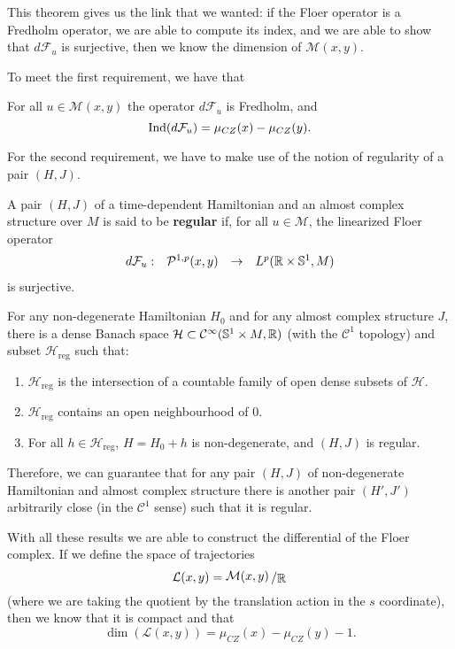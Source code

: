 This theorem gives us the link that we wanted: if the Floer operator is a Fredholm operator, we are able to compute its index, and we are able to show that $d\mathcal{F}_u$ is surjective, then we know the dimension of $\mathcal{M}(x,y)$.

To meet the first requirement, we have that

\begin{theo} \label{theo:floer_fredholm}
For all $u \in \mathcal{M}(x,y)$ the operator $d\mathcal{F}_u$ is Fredholm, and
\[\mathrm{Ind}(d\mathcal{F}_u) = \mu_{CZ}(x) - \mu_{CZ}(y) .\]
\end{theo}

For the second requirement, we have to make use of the notion of regularity of a pair $(H,J)$.

\begin{deff}
A pair $(H,J)$ of a time-dependent Hamiltonian and an almost complex structure over $M$ is said to be {\bf regular} if, for all $u \in \mathcal{M}$, the linearized Floer operator
\[\begin{array}{rccc} d\mathcal{F}_u : & \mathcal{P}^{1,p}(x,y) & \rightarrow & L^p(\mathbb{R}\times\mathbb{S}^1,M) \end{array}\]
is surjective.
\end{deff}

\begin{theo} \label{theo:regular}
For any non-degenerate Hamiltonian $H_0$ and for any almost complex structure $J$, there is a dense Banach space $\mathcal{H} \subset \mathcal{C}^{\infty}(\mathbb{S}^1 \times M, \mathbb{R})$ (with the $\mathcal{C}^1$ topology) and subset $\mathcal{H}_{\mathrm{reg}}$ such that:
\begin{enumerate}
	\item $\mathcal{H}_{\mathrm{reg}}$ is the intersection of a countable family of open dense subsets of $\mathcal{H}$.
	\item $\mathcal{H}_{\mathrm{reg}}$ contains an open neighbourhood of $0$.
	\item For all $h \in \mathcal{H}_{\mathrm{reg}}$, $H = H_0 + h$ is non-degenerate, and $(H,J)$ is regular.
\end{enumerate}
\end{theo}

Therefore, we can guarantee that for any pair $(H,J)$ of non-degenerate Hamiltonian and almost complex structure there is another pair $(H',J')$ arbitrarily close (in the $\mathcal{C}^1$ sense) such that it is regular.

With all these results we are able to construct the differential of the Floer complex. If we define the space of trajectories
\[\mathcal{L}(x,y) = \quocient{\mathcal{M}(x,y)}{\R}\]
(where we are taking the quotient by the translation action in the $s$ coordinate), then we know that it is compact and that
\[\dim(\mathcal{L}(x,y)) = \mu_{CZ}(x)-\mu_{CZ}(y)-1 .\]

